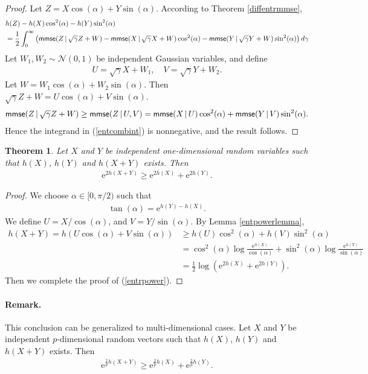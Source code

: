 \documentclass{article}
\numberwithin{equation}{section}
\newcommand{\e}{\mathrm{e}}
\renewcommand{\cal}{\mathcal}
\theoremstyle{plain}
\newtheorem{theorem}{Theorem}[section]
\theoremstyle{definition}
\begin{document}
\begin{proof}
Let $Z=X\cos(\alpha)+Y\sin(\alpha)$. According to Theorem \ref{diffentrmmse},
\begin{align}\label{entcombint}
	&h(Z)-h(X)\cos^2(\alpha)-h(Y)\sin^2(\alpha)\notag\\
	&=\frac{1}{2}\int_0^\infty\left({\sf mmse}(Z\,|\,\sqrt{\gamma}Z+W)-{\sf mmse}(X\,|\,\sqrt{\gamma}X+W)\cos^2(\alpha)-{\sf mmse}(Y\,|\,\sqrt{\gamma}Y+W)\sin^2(\alpha)\right)d\gamma
\end{align}
Let $W_1,W_2\sim\cal{N}(0,1)$ be independent Gaussian variables, and define
\begin{align*}
	U=\sqrt{\gamma}X+W_1,\quad V=\sqrt{\gamma}Y+W_2.
\end{align*}
Let $W=W_1\cos(\alpha)+W_2\sin(\alpha)$. Then $\sqrt{\gamma}Z+W=U\cos(\alpha)+V\sin(\alpha)$.
\begin{align*}
	{\sf mmse}(Z\,|\,\sqrt{\gamma}Z+W)\geq{\sf mmse}(Z\,|\,U,V)={\sf mmse}(X\,|\,U)\cos^2(\alpha)+{\sf mmse}(Y\,|\,V)\sin^2(\alpha).
\end{align*}
Hence the integrand in (\ref{entcombint}) is nonnegative, and the result follows.
\end{proof}

\begin{theorem}
Let $X$ and $Y$ be independent one-dimensional random variables such that $h(X)$, $h(Y)$ and $h(X + Y)$ exists. Then
\begin{align}
	\e^{2h(X+Y)}\geq \e^{2h(X)}+\e^{2h(Y)}.\label{entrpower}
\end{align}
\end{theorem}
\begin{proof}
We choose $\alpha\in[0,\pi/2)$ such that
\begin{align*}
	\tan(\alpha)=\e^{h(Y)-h(X)}.
\end{align*}
We define $U=X/\cos(\alpha)$, and $V=Y/\sin(\alpha)$. By Lemma \ref{entpowerlemma},
\begin{align*}
	h(X+Y)=h(U\cos(\alpha)+V\sin(\alpha))&\geq h(U)\cos^2(\alpha)+h(V)\sin^2(\alpha)\\
	&=\cos^2(\alpha)\log\frac{\e^{h(X)}}{\cos(\alpha)}+\sin^2(\alpha)\log\frac{\e^{h(Y)}}{\sin(\alpha)}\\
	&=\frac{1}{2}\log\left(\e^{2h(X)}+\e^{2h(Y)}\right).
\end{align*}
Then we complete the proof of (\ref{entrpower}).
\end{proof}
\paragraph{Remark.} This conclusion can be generalized to multi-dimensional cases. Let $X$ and $Y$ be independent $p$-dimensional random vectors such that $h(X)$, $h(Y)$ and $h(X + Y)$ exists. Then
\begin{align*}
	\e^{\frac{2}{p}h(X+Y)}\geq \e^{\frac{2}{p}h(X)}+\e^{\frac{2}{p}h(Y)}.
\end{align*}
\end{document}
